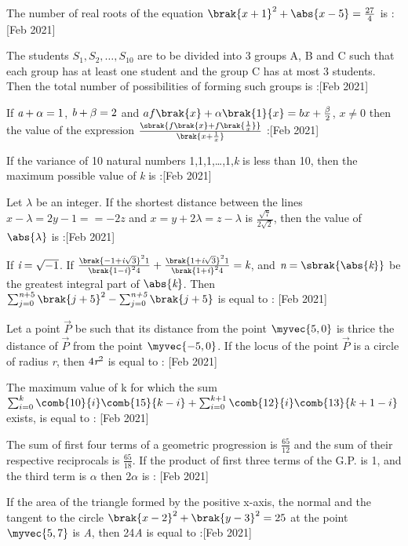 \iffalse
\title{2021}
\author{EE24BTECH11012}
\section{integer}
\fi
	\item The number of real roots of the equation $ \brak{x+1}^2 + \abs{x-5} = \frac{27}{4} $ is : \hfill{[Feb 2021]}
	\item The students $S_1, S_2, \dots, S_{10}$ are to be divided into 3 groups A, B and C such that each group has at least one student and the group C has at most 3 students. Then the total number of possibilities of forming such groups is :\hfill{[Feb 2021]}
	\item If $ \emph{a} + \alpha = 1 $, $ \emph{b} + \beta = 2 $ and $af\brak{x} + \alpha\brak{1}{x} = bx + \frac{\beta}{2} $, $ x\neq0 $ then the value of the expression $\frac{\sbrak{f\brak{x} + f\brak{\frac{1}{x}}}}{\brak{x + \frac{1}{x}}}$ :\hfill{[Feb 2021]}
	\item If the variance of 10 natural numbers 1,1,1,\dots,1,\emph{k} is less than 10, then the maximum possible value of \emph{k} is :\hfill{[Feb 2021]}
	\item Let $\lambda$ be an integer. If the shortest distance between the lines $ x - \lambda = 2y - 1 = = -2z $ and $ x = y + 2\lambda = z - \lambda $ is $\frac{\sqrt{7}}{2\sqrt{2}}$, then the value of $\abs{\lambda}$ is :\hfill{[Feb 2021]}
	\item If $ \emph{i} = \sqrt{-1} $. If $ \frac{\brak{-1+\emph{i}\sqrt{3}}^21}{\brak{1-\emph{i}}^24} + \frac{\brak{1+\emph{i}\sqrt{3}}^21}{\brak{1+\emph{i}}^24} = \emph{k}$, and $ \emph{n} = \sbrak{\abs{\emph{k}}}$ be the greatest integral part of $\abs{\emph{k}}$. Then $ \sum_{j=0}^{\emph{n}+5} \brak{j+5}^2 - \sum_{j=0}^{\emph{n+5}} \brak{j+5} $ is equal to : \hfill{[Feb 2021]}
	\item Let a point $\vec{P}$ be such that its distance from the point $\myvec{5,0}$ is thrice the distance of $\vec{P}$ from the point $\myvec{-5,0}$. If the locus of the point $\vec{P}$ is a circle of radius \emph{r}, then $4\emph{r}^2$ is equal to : \hfill{[Feb 2021]}
	\item The maximum value of k for which the sum $ \sum_{i=0}^{k} \comb{10}{i} \comb{15}{k-i} + \sum_{i=0}^{k+1} \comb{12}{i} \comb{13}{k+1-i} $ exists, is equal to : \hfill{[Feb 2021]}

	\item The sum of first four terms of a geometric progression is $\frac{65}{12}$ and the sum of their respective reciprocals is $\frac{65}{18}$. If the product of first three terms of the G.P. is 1, and the third term is $\alpha$ then $2\alpha$ is : \hfill{[Feb 2021]}

	\item If the area of the triangle formed by the positive x-axis, the normal and the tangent to the circle $\brak{x-2}^2 + \brak{y-3}^2 = 25$ at the point $\myvec{5,7}$ is \emph{A}, then 24\emph{A} is equal to :\hfill{[Feb 2021]}
